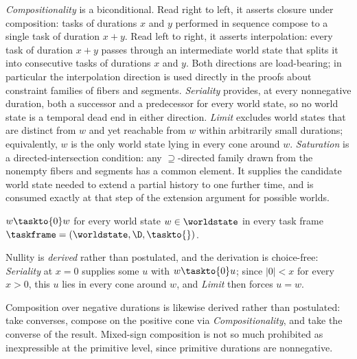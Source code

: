 \documentclass[../BimodalReference.tex]{subfiles}
\begin{document}
\noindent
\emph{Compositionality} is a biconditional.
Read right to left, it asserts closure under composition: tasks of durations $x$ and $y$ performed in sequence compose to a single task of duration $x + y$.
Read left to right, it asserts interpolation: every task of duration $x + y$ passes through an intermediate world state that splits it into consecutive tasks of durations $x$ and $y$.
Both directions are load-bearing; in particular the interpolation direction is used directly in the proofs about constraint families of fibers and segments.
\emph{Seriality} provides, at every nonnegative duration, both a successor and a predecessor for every world state, so no world state is a temporal dead end in either direction.
\emph{Limit} excludes world states that are distinct from $w$ and yet reachable from $w$ within arbitrarily small durations; equivalently, $w$ is the only world state lying in every cone around $w$.
\emph{Saturation} is a directed-intersection condition: any $\supseteq$-directed family drawn from the nonempty fibers and segments has a common element.
It supplies the candidate world state needed to extend a partial history to one further time, and is consumed exactly at that step of the extension argument for possible worlds.

\begin{lemma}[Nullity]\label{lem:nullity}
$w \taskto{0} w$ for every world state $w \in \worldstate$ in every task frame $\taskframe = (\worldstate, \D, {\taskto{}})$.
\end{lemma}

\noindent
Nullity is \emph{derived} rather than postulated, and the derivation is choice-free: \emph{Seriality} at $x = 0$ supplies some $u$ with $w \taskto{0} u$; since $|0| < x$ for every $x > 0$, this $u$ lies in every cone around $w$, and \emph{Limit} then forces $u = w$.

\begin{remark}
Composition over negative durations is likewise derived rather than postulated: take converses, compose on the positive cone via \emph{Compositionality}, and take the converse of the result.
Mixed-sign composition is not so much prohibited as inexpressible at the primitive level, since primitive durations are nonnegative.
\end{remark}
\end{document}

